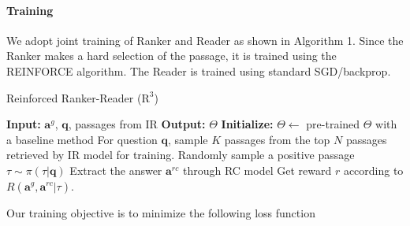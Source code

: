 \documentclass[letterpaper]{article} \usepackage{aaai18}  \usepackage{times}  \usepackage{helvet}  \usepackage{courier}  \usepackage{url}  \usepackage{graphicx}  \usepackage{comment}
\begin{document}
\paragraph{Training}

We adopt joint training of Ranker and Reader as shown in Algorithm 1.  Since the Ranker makes a hard selection of the passage, it is trained using the REINFORCE algorithm. The Reader is trained using standard
SGD/backprop.


\begin{algorithm}
	\label{algorithm:alg1}
    \caption{Reinforced Ranker-Reader ($\text{R}^{3}$)}
  \begin{algorithmic}[1]
\State \textbf{Input: }$\mathbf{a}^{g}$, $\mathbf{q}$, passages from IR
    \State \textbf{Output:} $\Theta$ 
    \State \textbf{Initialize:}
     $\Theta \gets$ pre-trained $\Theta$ with a baseline method\footnotemark
      \STATE For question $\mathbf{q}$, sample $K$ passages from the top $N$ passages retrieved by IR model for training. \footnotemark
\STATE Randomly sample a positive passage $\tau \sim \pi (\tau | \mathbf{q})$
      \STATE Extract the answer $\mathbf{a}^{rc}$ through RC model
      \STATE Get reward $r$ according to $R(\mathbf{a}^g,\mathbf{a}^{rc}|\tau)$.
	\ENDFOR
  \end{algorithmic}
\end{algorithm}
 \addtocounter{footnote}{-2} 

\begin{comment}
\begin{equation}
J(\theta)=
-\mathbb{E}_{\tau  \sim \pi (\tau |\theta^r ))} \left(r + \text{log} (\mathbf{\beta}^\text{s}_{a^s_\tau }) +
\text{log} (\mathbf{\beta}^\text{e}_{a^e_\tau }) \right)
\end{equation}
\end{comment}

Our training objective is to minimize the following loss function
\end{document}

